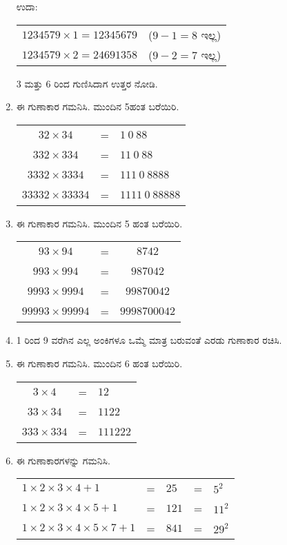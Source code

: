 \begin{enumerate}
ಉದಾ: 
\begin{tabular}[t]{ll}
$1234579\times 1 = 12345679$ & ($9 - 1 = 8$ ಇಲ್ಲ)\\
$1234579\times 2 = 24691358$ & ($9 - 2 = 7$ ಇಲ್ಲ)
\end{tabular}

3 ಮತ್ತು 6 ರಿಂದ ಗುಣಿಸಿದಾಗ ಉತ್ತರ ನೋಡಿ. 

\item ಈ ಗುಣಾಕಾರ ಗಮನಿಸಿ. ಮುಂದಿನ 5ಹಂತ ಬರೆಯಿರಿ. 

\begin{tabular}[t]{ccl}
$32\times 34$ & = & $1~0~88$\\
$332\times 334$ & = & $11~0~88$\\
$3332\times 3334$ & = & $111~0~8888$\\
$33332\times 33334$ & = & $1111~0~88888$\\
\end{tabular}

\item ಈ ಗುಣಾಕಾರ ಗಮನಿಸಿ. ಮುಂದಿನ 5 ಹಂತ ಬರೆಯಿರಿ. 

\begin{tabular}[t]{ccc}
$93\times 94$ & = & $8742$\\
$993\times 994$ & = & $987042$\\
$9993\times 9994$ & = & $99870042$\\
$99993\times 99994$ & = & $9998700042$
\end{tabular}

\item 1 ರಿಂದ 9 ವರೆಗಿನ ಎಲ್ಲ ಅಂಕಿಗಳೂ ಒಮ್ಮೆ ಮಾತ್ರ ಬರುವಂತೆ ಎರಡು ಗುಣಾಕಾರ ರಚಿಸಿ. 

\item ಈ ಗುಣಾಕಾರ ಗಮನಿಸಿ. ಮುಂದಿನ 6 ಹಂತ ಬರೆಯಿರಿ. 

\begin{tabular}[t]{ccl}
$3\times 4$ & = & $12$\\
$33\times 34$ & = & $1122$\\
$333\times 334$ & = & $111222$
\end{tabular}

\item ಈ ಗುಣಾಕಾರಗಳನ್ನು ಗಮನಿಸಿ. 

\begin{tabular}[t]{lllll}
$1\times 2\times 3\times 4 + 1$ & = & $25$ & = & $5^{2}$\\
$1\times 2\times 3\times 4\times 5 + 1$ & = & $121$ & = & $11^{2}$\\
$1\times 2\times 3\times 4\times 5\times 7 + 1$ & = & $841$ & = & $29^{2}$
\end{tabular}


\end{enumerate}
